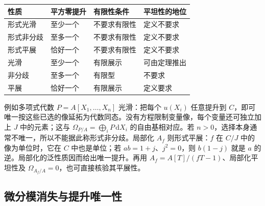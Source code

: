 \begin{center}
	\begin{minipage}{\textwidth}
		\makeatletter
		\def\@captype{table}
		\makeatother
		\centering
		\caption[无穷小提升性质的条件]{无穷小提升性质的条件。固定交换环同态 \(A\to B\)；提升栏对任意交换 \(A\) 代数 \(C\)、平方零理想 \(J\subseteq C\) 及 \(A\) 代数同态 \(B\to C/J\) 而言。平展行的提升刻画及光滑的平坦性由的相应定理给出。}
		\label{b3:tab:infinitesimal-properties}
		\begin{tabularx}{\textwidth}{@{}>{\raggedright\arraybackslash}p{}>{\raggedright\arraybackslash}p{}>{\raggedright\arraybackslash}p{}>{\raggedright\arraybackslash}X@{}}
			\toprule
			性质 & 平方零提升 & 有限性条件 & 平坦性的地位\\
			\midrule
			形式光滑 & 至少一个 & 不要求有限性 & 定义不要求\\
			形式非分歧 & 至多一个 & 不要求有限性 & 定义不要求\\
			形式平展 & 恰好一个 & 不要求有限性 & 定义不要求\\
			光滑 & 至少一个 & 有限展示 & 可由定理推出\\
			非分歧 & 至多一个 & 有限型 & 不要求\\
			平展 & 恰好一个 & 有限展示 & 定义要求\\
			\bottomrule
		\end{tabularx}
	\end{minipage}
\end{center}

\ProseParagraphBreak
例如多项式代数 \(P=A[X_1,\ldots,X_n]\) 光滑：把每个 \(u(X_i)\) 任意提升到 \(C\)，即可唯一按这些已选的像延拓为代数同态。没有方程限制变量像，每个变量还可独立加上 \(J\) 中的元素；这与 \(\Omega_{P/A}=\bigoplus_iP\,\mathrm{d}X_i\) 的自由基相对应。若 \(n>0\)，选择本身通常不唯一，所以不能据此称形式非分歧。局部化 \(A_f\) 则形式平展：\(f\) 在 \(C/J\) 中的像为单位时，它在 \(C\) 中也是单位；若 \(ab=1+j\)、\(j^2=0\)，则 \(b(1-j)\) 就是 \(a\) 的逆。局部化的泛性质因而给出唯一提升。再用 \(A_f=A[T]/(fT-1)\)、局部化平坦性及 \(\Omega_{A_f/A}=0\)，也可直接核验其平展性。

\subsection{微分模消失与提升唯一性}
\label{b3:subsec:1405:02}
\label{b3:subsec:1404:03}

